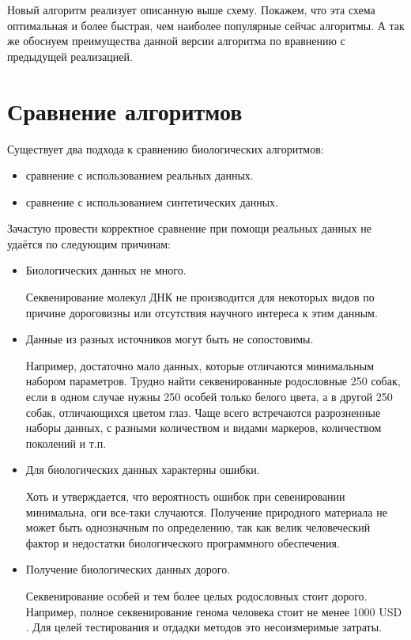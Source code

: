 \documentclass{matmex-diploma-custom}
\begin{document}
Новый  алгоритм реализует описанную выше схему. Покажем, что
эта схема оптимальная и более быстрая, чем наиболее популярные сейчас
алгоритмы. А так же обоснуем преимущества данной версии алгоритма по
вравнению с предыдущей реализацией.

\section{Сравнение алгоритмов}

Существует два подхода к сравнению биологических алгоритмов:
\begin{itemize}
\item сравнение с использованием реальных данных.
\item сравнение с использованием синтетических данных.
\end{itemize}

Зачастую провести корректное сравнение при помощи реальных данных не
удаётся по следующим причинам:

\begin{itemize}
\item Биологических данных не много.

  Секвенирование молекул ДНК не производится для некоторых видов по
  причине дороговизны или отсутствия научного интереса к этим данным.

\item Данные из разных источников могут быть не сопостовимы.

  Например, достаточно мало данных, которые отличаются минимальным
  набором параметров. Трудно найти секвенированные родословные 250
  собак, если в одном случае нужны 250 особей только белого цвета, а в
  другой 250 собак, отличающихся цветом глаз. Чаще всего встречаются
  разрозненные наборы данных, с разными количеством и видами маркеров,
  количеством поколений и т.п.

\item Для биологических данных характерны ошибки.

  Хоть и утверждается, что вероятность ошибок при севенировании
  минимальна, оги все-таки случаются. Получение природного материала
  не может быть однозначным по определению, так как велик человеческий
  фактор и недостатки биологического программного обеспечения.

\item Получение биологических данных дорого.

  Секвенирование особей и тем более целых родословных стоит
  дорого. Например, полное секвенирование генома человека стоит не
  менее 1000 USD \cite{kircher2010high}. Для целей тестирования и
  отдадки методов это несоизмеримые затраты.

\end{itemize}
\end{document}
